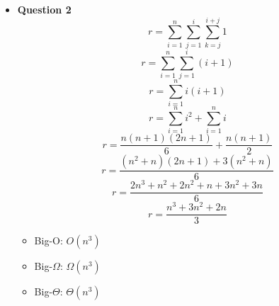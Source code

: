 \documentclass{article}
\begin{document}
\begin{itemize}
    \item\textbf{ Question 2}
        \begin{equation}
            r=\sum^{n}_{i=1} \sum^{i}_{j=1} \sum^{i+j}_{k=j} 1
        \end{equation}
        \begin{equation}
            r=\sum^{n}_{i=1} \sum^{i}_{j=1} (i+1)
        \end{equation}
        \begin{equation}
            r=\sum^{n}_{i=1} i(i+1)
        \end{equation}
        \begin{equation}
            r=\sum^{n}_{i=1} i^2 + \sum^{n}_{i=1} i
        \end{equation}
        \begin{equation}
            r=\frac{n(n+1)(2n+1)}{6} + \frac{n(n+1)}{2}
        \end{equation}
        \begin{equation}
            r=\frac{(n^2+n)(2n+1) + 3(n^2+n)}{6}
        \end{equation}
        \begin{equation}
            r=\frac{2n^3 + n^2 + 2n^2 + n + 3n^2 + 3n}{6}
        \end{equation}
        \begin{equation}
            r=\frac{n^3 + 3n^2 + 2n}{3}
        \end{equation}
        \begin{itemize}
            \item[] Big-O: $O(n^3)$
            \item[] Big-$\Omega$: $\Omega(n^3)$
            \item[] Big-$\Theta$: $\Theta(n^3)$
        \end{itemize}
\end{itemize}
\end{document}
